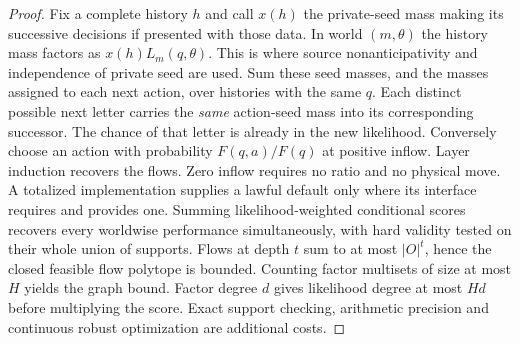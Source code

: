 \begin{proof}
Fix a complete history \(h\) and call \(x(h)\) the private-seed mass making its successive decisions if presented with those data. In world \((m,\theta)\) the history mass factors as \(x(h)L_m(q,\theta)\). This is where source nonanticipativity and independence of private seed are used. Sum these seed masses, and the masses assigned to each next action, over histories with the same \(q\). Each distinct possible next letter carries the \emph{same} action-seed mass into its corresponding successor. The chance of that letter is already in the new likelihood. Conversely choose an action with probability \(F(q,a)/F(q)\) at positive inflow. Layer induction recovers the flows. Zero inflow requires no ratio and no physical move. A totalized implementation supplies a lawful default only where its interface requires and provides one. Summing likelihood-weighted conditional scores recovers every worldwise performance simultaneously, with hard validity tested on their whole union of supports. Flows at depth \(t\) sum to at most \(|O|^t\), hence the closed feasible flow polytope is bounded. Counting factor multisets of size at most \(H\) yields the graph bound. Factor degree \(d\) gives likelihood degree at most \(Hd\) before multiplying the score. Exact support checking, arithmetic precision and continuous robust optimization are additional costs.
\end{proof}

